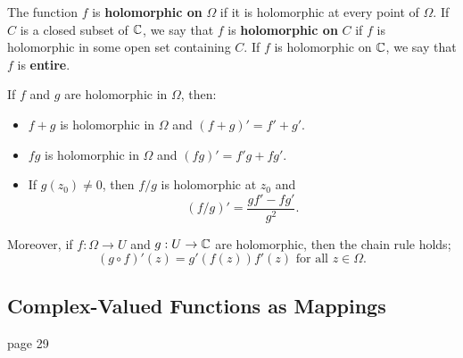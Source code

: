 \documentclass{exam}
\begin{document}
The function $f$ is \textbf{holomorphic on} $\Omega$ if it is holomorphic at every point of $\Omega$.
If $C$ is a closed subset of $\mathbb{C}$, we say that $f$ is \textbf{holomorphic on} $C$ if $f$ is holomorphic
in some open set containing $C$. If $f$ is holomorphic on $\mathbb{C}$, we say that $f$ is \textbf{entire}.

\newpage
\begin{proposition}\label{prop:main}
    If $f$ and $g$ are holomorphic in $\Omega$, then:
    \begin{itemize}
        \item $f + g$ is holomorphic in $\Omega$ and $(f + g)' = f' + g'$.

        \item $fg$ is holomorphic in $\Omega$ and $(fg)' = f'g + fg'$.

        \item If $g(z_0) \neq 0$, then $f/g$ is holomorphic at $z_0$ and
        $$(f/g)' = \frac{gf' - fg'}{g^2}.$$
    \end{itemize}

    Moreover, if $f: \Omega\to U$ and $g: U\to\mathbb{C}$ are holomorphic, then the chain rule holds;
    $$(g\circ f)'(z) = g'(f(z))f'(z) \text{ for all } z\in\Omega.$$
\end{proposition}


\subsection*{Complex-Valued Functions as Mappings}
page 29
\end{document}
